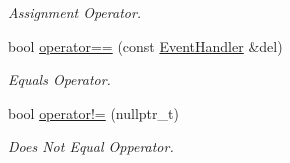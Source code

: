 \begin{DoxyCompactItemize}
\begin{DoxyCompactList}\small\item\em Assignment Operator. \end{DoxyCompactList}\item 
\mbox{\label{class_event_handler_a5a967210bc6305b30907418a92ce33bd}} 
bool \mbox{\hyperlink{class_event_handler_a5a967210bc6305b30907418a92ce33bd}{operator==}} (const \mbox{\hyperlink{class_event_handler}{Event\+Handler}} \&del)
\begin{DoxyCompactList}\small\item\em Equals Operator. \end{DoxyCompactList}\item 
\mbox{\label{class_event_handler_a1f294dfbcd25a69b680e8647e7939c52}} 
bool \mbox{\hyperlink{class_event_handler_a1f294dfbcd25a69b680e8647e7939c52}{operator!=}} (nullptr\+\_\+t)
\begin{DoxyCompactList}\small\item\em Does Not Equal Opperator. \end{DoxyCompactList}\end{DoxyCompactItemize}
